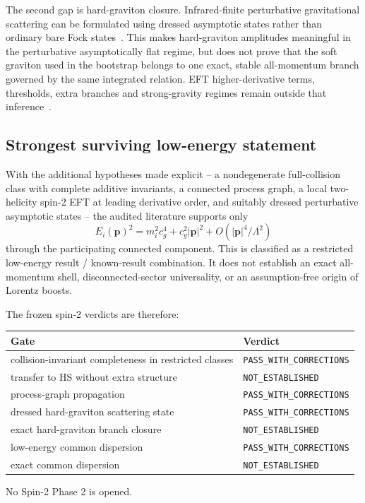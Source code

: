 \documentclass[11pt,a4paper]{article}
\begin{document}
The second gap is hard-graviton closure. Infrared-finite perturbative gravitational scattering can be formulated using dressed asymptotic states rather than ordinary bare Fock states~\cite{ware2013,choi2017}. This makes hard-graviton amplitudes meaningful in the perturbative asymptotically flat regime, but does not prove that the soft graviton used in the bootstrap belongs to one exact, stable all-momentum branch governed by the same integrated relation. EFT higher-derivative terms, thresholds, extra branches and strong-gravity regimes remain outside that inference~\cite{giddings2009,donoghue1994}.

\subsection{Strongest surviving low-energy statement}
With the additional hypotheses made explicit -- a nondegenerate full-collision class with complete additive invariants, a connected process graph, a local two-helicity spin-2 EFT at leading derivative order, and suitably dressed perturbative asymptotic states -- the audited literature supports only
\begin{equation}
\boxed{
E_i(\mathbf p)^2
=
m_i^2c_g^4+c_g^2|\mathbf p|^2
+O(|\mathbf p|^4/\Lambda^2)
}
\end{equation}
through the participating connected component. This is classified as a restricted low-energy result / known-result combination. It does not establish an exact all-momentum shell, disconnected-sector universality, or an assumption-free origin of Lorentz boosts.

The frozen spin-2 verdicts are therefore:
\begin{center}
\begin{tabular}{ll}
\toprule
Gate & Verdict\\
\midrule
collision-invariant completeness in restricted classes & \texttt{PASS\_WITH\_CORRECTIONS}\\
transfer to HS without extra structure & \texttt{NOT\_ESTABLISHED}\\
process-graph propagation & \texttt{PASS\_WITH\_CORRECTIONS}\\
dressed hard-graviton scattering state & \texttt{PASS\_WITH\_CORRECTIONS}\\
exact hard-graviton branch closure & \texttt{NOT\_ESTABLISHED}\\
low-energy common dispersion & \texttt{PASS\_WITH\_CORRECTIONS}\\
exact common dispersion & \texttt{NOT\_ESTABLISHED}\\
\bottomrule
\end{tabular}
\end{center}
No Spin-2 Phase 2 is opened.
\end{document}
